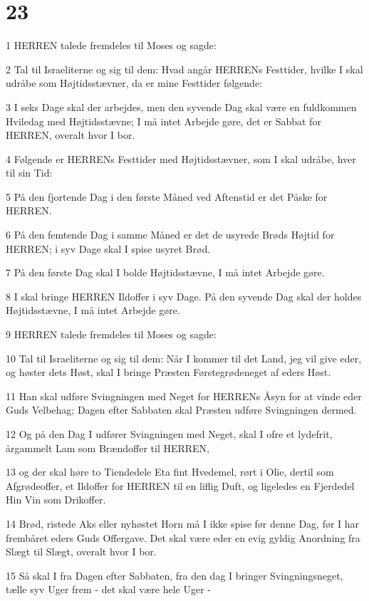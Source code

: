 \chapter{23}

\par 1 HERREN talede fremdeles til Moses og sagde:
\par 2 Tal til Israeliterne og sig til dem: Hvad angår HERRENs Festtider, hvilke I skal udråbe som Højtidsstævner, da er mine Festtider følgende:
\par 3 I seks Dage skal der arbejdes, men den syvende Dag skal være en fuldkommen Hviledag med Højtidsstævne; I må intet Arbejde gøre, det er Sabbat for HERREN, overalt hvor I bor.
\par 4 Følgende er HERRENs Festtider med Højtidsstævner, som I skal udråbe, hver til sin Tid:
\par 5 På den fjortende Dag i den første Måned ved Aftenstid er det Påske for HERREN.
\par 6 På den femtende Dag i samme Måned er det de usyrede Brøds Højtid for HERREN; i syv Dage skal I spise usyret Brød.
\par 7 På den første Dag skal I bolde Højtidsstævne, I må intet Arbejde gøre.
\par 8 I skal bringe HERREN Ildoffer i syv Dage. På den syvende Dag skal der holdes Højtidsstævne, I må intet Arbejde gøre.
\par 9 HERREN talede fremdeles til Moses og sagde:
\par 10 Tal til Israeliterne og sig til dem: Når I kommer til det Land, jeg vil give eder, og høster dets Høst, skal I bringe Præsten Førstegrødeneget af eders Høst.
\par 11 Han skal udføre Svingningen med Neget for HERRENs Åsyn for at vinde eder Guds Velbehag; Dagen efter Sabbaten skal Præsten udføre Svingningen dermed.
\par 12 Og på den Dag I udfører Svingningen med Neget, skal I ofre et lydefrit, årgammelt Lam som Brændoffer til HERREN,
\par 13 og der skal høre to Tiendedele Eta fint Hvedemel, rørt i Olie, dertil som Afgrødeoffer, et Ildoffer for HERREN til en liflig Duft, og ligeledes en Fjerdedel Hin Vin som Drikoffer.
\par 14 Brød, ristede Aks eller nyhøstet Horn må I ikke spise før denne Dag, før I har frembåret eders Guds Offergave. Det skal være eder en evig gyldig Anordning fra Slægt til Slægt, overalt hvor I bor.
\par 15 Så skal I fra Dagen efter Sabbaten, fra den dag I bringer Svingningsneget, tælle syv Uger frem - det skal være hele Uger -

